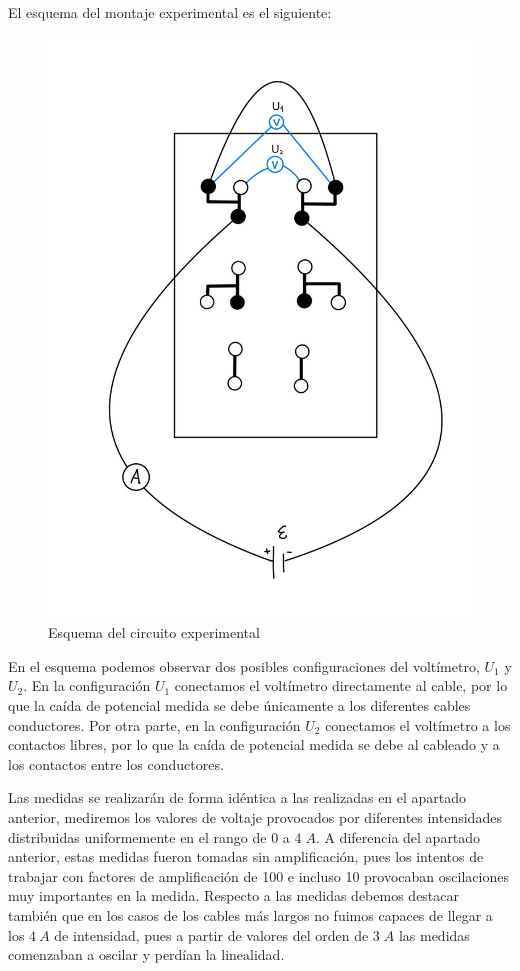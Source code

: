 \documentclass[a4paper,12pt,titlepage]{report}
\begin{document}
El esquema del montaje experimental es el siguiente:

\begin{figure}[h!]
    \centering
    \includegraphics[width=0.65\linewidth]{Images/esquema caja conexiones.jpeg}
    \caption{Esquema del circuito experimental}
    \label{Caja de conexiones}
\end{figure}

En el esquema podemos observar dos posibles configuraciones del voltímetro, $U_{1}$ y $U_{2}$. En la configuración $U_{1}$ conectamos el voltímetro directamente al cable, por lo que la caída de potencial medida se debe únicamente a los diferentes cables conductores. Por otra parte, en la configuración $U_{2}$ conectamos el voltímetro a los contactos libres, por lo que la caída de potencial medida se debe al cableado y a los contactos entre los conductores.

\par Las medidas se realizarán de forma idéntica a las realizadas en el apartado anterior, mediremos los valores de voltaje provocados por diferentes intensidades distribuidas uniformemente en el rango de $0$ a $4 \;A$. A diferencia del apartado anterior, estas medidas fueron tomadas sin amplificación, pues los intentos de trabajar con factores de amplificación de 100 e incluso 10 provocaban oscilaciones muy importantes en la medida. Respecto a las medidas debemos destacar también que en los casos de los cables más largos no fuimos capaces de llegar a los $4 \: A$ de intensidad, pues a partir de valores del orden de $3\; A$ las medidas comenzaban a oscilar y perdían la linealidad.
\end{document}
